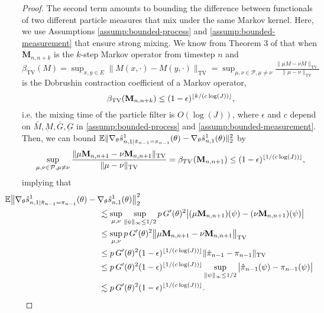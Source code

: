\begin{proof}
The second term amounts to bounding the difference between functionals of two different particle measures that mix under the same Markov kernel. Here, we use Assumptions \ref{assump:bounded-process} and \ref{assump:bounded-measurement} that ensure strong mixing. We know from Theorem 3 of \cite{karjalainen23} that when $\textbf{M}_{n,n+k}$ is the $k$-step Markov operator from timestep $n$ and $\beta_{\text{TV}}(M) = \sup _{x, y \in E}\|M(x, \cdot)-M(y, \cdot)\|_{\mathrm{TV}}=\sup _{\mu, \nu \in \mathcal{P}, \mu \neq \nu} \frac{\|\mu M-\nu M\|_{\mathrm{TV}}}{\|\mu-\nu\|_{\mathrm{TV}}}$ is the Dobrushin contraction coefficient of a Markov operator, 
\begin{equation}
\beta_{\text{TV}}(\textbf{M}_{n,n+k}) \leq (1-\epsilon)^{\lfloor k/(c\log(J)) \rfloor},
\end{equation}
i.e. the mixing time of the particle filter is $O(\log(J))$, where $\epsilon$ and $c$ depend on $\bar{M}, \underbar{M}, \bar{G}, \underbar{G}$ in \ref{assump:bounded-process} and \ref{assump:bounded-measurement}. 
Then, we can bound 
$\mathbb{E}\|\nabla_\theta\hat s_{n,1|\hat\pi_{n-1}=\pi_{n-1}}^1(\theta) - \nabla_\theta\hat s_{n,1}^1(\theta)\|_2^2$ by
\begin{equation}
\sup _{\mu, \nu \in \mathcal{P}, \mu \neq \nu} \frac{\|\mu \textbf{M}_{n,n+1}-\nu \textbf{M}_{n,n+1}\|_{\mathrm{TV}}}{\|\mu-\nu\|_{\mathrm{TV}}} = \beta_{TV}(\textbf{M}_{n,n+1}) \leq (1-\epsilon)^{\lfloor 1/(c\log(J)) \rfloor},
\end{equation}
implying that
\begin{align}
    & \hspace{-10mm}
    \E\big\|\nabla_\theta\hat s_{n,1|\hat\pi_{n-1}=\pi_{n-1}}^1(\theta) - \nabla_\theta\hat s_{n,1}^1(\theta)\big\|_2^2 
    \\ & \hspace{30mm}
    \lesssim \sup_{\mu, \nu} \sup_{\|\psi\|_\infty \leq 1/2} p \, G'(\theta)^2\big|(\mu \textbf{M}_{n,n+1})(\psi)-(\nu \textbf{M}_{n,n+1})(\psi)\big| 
    \\ & \hspace{30mm}
    \leq \sup_{\mu, \nu} p \, G'(\theta)^2\big\|\mu \textbf{M}_{n,n+1}-\nu \textbf{M}_{n,n+1}\big\|_{\mathrm{TV}} 
    \\ & \hspace{30mm}
    \leq p \, G'(\theta)^2(1-\epsilon)^{\floor{1/(c\log(J))}} \|\hat\pi_{n-1} - \pi_{n-1}\|_{\text{TV}} 
    \\ & \hspace{30mm}
    \leq p \, G'(\theta)^2(1-\epsilon)^{\floor{1/(c\log(J))}} \sup_{\|\psi\|_{\infty} \leq 1/2} \big|\hat\pi_{n-1}(\psi) - \pi_{n-1}(\psi)\big| 
    \\ & \hspace{30mm}
    \lesssim p \, G'(\theta)^2(1-\epsilon)^{\floor{1/(c\log(J))}}.
\end{align}


\end{proof}
